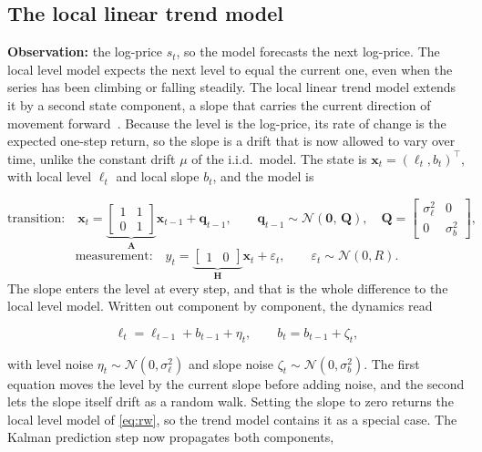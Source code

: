 \subsection{The local linear trend model}
\textbf{Observation:} the log-price $s_t$, so the model forecasts the next log-price.
The local level model expects the next level to equal the current one, even when the series has been climbing or falling steadily. The local linear trend model extends it by a second state component, a slope that carries the current direction of movement forward~\cite[Section~4.1]{triantafyllopoulos:bayesian_state_space}. Because the level is the log-price, its rate of change is the expected one-step return, so the slope is a drift that is now allowed to vary over time, unlike the constant drift $\mu$ of the i.i.d.\ model. The state is $\mathbf{x}_t = (\ell_t, b_t)^\top$, with local level $\ell_t$ and local slope $b_t$, and the model is

\begin{equation}\label{eq:llt-state}
  \text{transition:}\quad
  \mathbf{x}_t =
  \underbrace{\begin{bmatrix} 1 & 1 \\ 0 & 1 \end{bmatrix}}_{\mathbf{A}}
  \mathbf{x}_{t-1} + \mathbf{q}_{t-1},
  \qquad
  \mathbf{q}_{t-1} \sim \mathcal{N}\!\left(\mathbf{0},\,
  \mathbf{Q}\right),
  \quad
  \mathbf{Q} = \begin{bmatrix} \sigma_\ell^2 & 0 \\ 0 & \sigma_b^2 \end{bmatrix},
\end{equation}
\begin{equation}\label{eq:llt-obs}
  \text{measurement:}\quad
  y_t = \underbrace{\begin{bmatrix} 1 & 0 \end{bmatrix}}_{\mathbf{H}}\mathbf{x}_t + \varepsilon_t,
  \qquad
  \varepsilon_t \sim \mathcal{N}(0, R).
\end{equation}
The slope enters the level at every step, and that is the whole difference to the local level model. Written out component by component, the dynamics read

\begin{equation}\label{eq:llt-components}
  \ell_t = \ell_{t-1} + b_{t-1} + \eta_t,\qquad
  b_t   = b_{t-1} + \zeta_t,  
\end{equation}

with level noise $\eta_t \sim \mathcal{N}(0,\sigma_\ell^2)$ and slope noise $\zeta_t \sim \mathcal{N}(0,\sigma_b^2)$. The first equation moves the level by the current slope before adding noise, and the second lets the slope itself drift as a random walk. Setting the slope to zero returns the local level model of \eqref{eq:rw}, so the trend model contains it as a special case. The Kalman prediction step now propagates both components,


